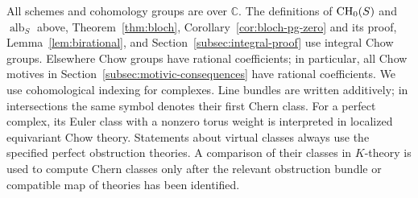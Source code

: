 All schemes and cohomology groups are over \(\mathbb C\).
The definitions of \(\operatorname{CH}_0(S)\) and \(\operatorname{alb}_S\) above,
Theorem~\ref{thm:bloch}, Corollary~\ref{cor:bloch-pg-zero} and its proof,
Lemma~\ref{lem:birational}, and Section~\ref{subsec:integral-proof} use
integral Chow groups. Elsewhere Chow groups have rational coefficients;
in particular, all Chow motives in Section~\ref{subsec:motivic-consequences}
have rational coefficients.
We use cohomological indexing for complexes. Line bundles are written
additively; in intersections the same symbol denotes their first
Chern class. For a perfect complex, its Euler class with a nonzero
torus weight is interpreted in localized equivariant Chow theory.
Statements about virtual classes always use the specified perfect
obstruction theories. A comparison of their classes in \(K\)-theory
is used to compute Chern classes only after the relevant obstruction
bundle or compatible map of theories has been identified.
